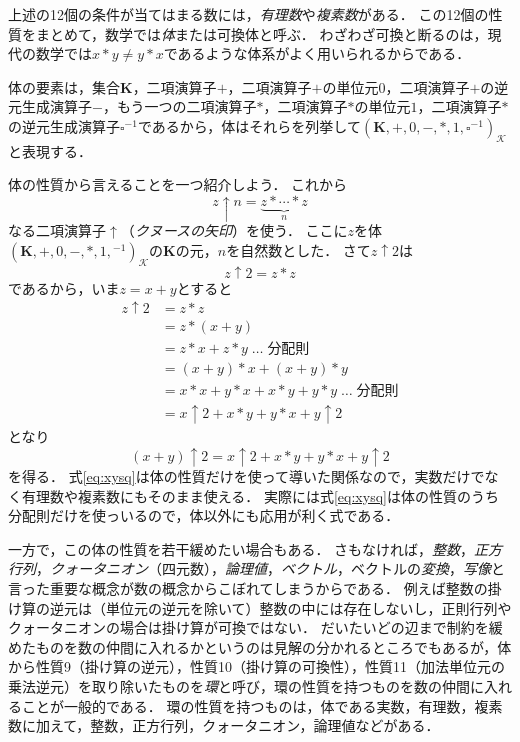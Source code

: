 \documentclass[twocolumn]{jsbook}
\newcommand{\keyword}[1]{\emph{#1}}
\newcommand{\mathSomething}{\square}
\newcommand{\mathSet}[1]{\mathbf{#1}}
\newcommand{\mathField}[7]{(#1,#2,#3,#4,#5,#6,#7)_\mathcal{K}}
\begin{document}
上述の12個の条件が当てはまる数には，\keyword{有理数}や\keyword{複素数}がある．
この12個の性質をまとめて，数学では\keyword{体}または可換体と呼ぶ．
わざわざ可換と断るのは，現代の数学では$x*y\neq y*x$であるような体系がよく用いられるからである．

体の要素は，集合$\mathSet{K}$，二項演算子$+$，二項演算子$+$の単位元$0$，二項演算子$+$の逆元生成演算子$-$，もう一つの二項演算子$*$，二項演算子$*$の単位元$1$，二項演算子$*$の逆元生成演算子$\mathSomething^{-1}$であるから，体はそれらを列挙して$\mathField{\mathSet{K}}{+}{0}{-}{*}{1}{\mathSomething^{-1}}$と表現する．

体の性質から言えることを一つ紹介しよう．
これから$$z\uparrow n=\underbrace{z*\dotsb*z}_n$$なる二項演算子$\uparrow$（\keyword{クヌースの矢印}）を使う．
ここに$z$を体$\mathField{\mathSet{K}}{+}{0}{-}{*}{1}{{}^{-1}}$の$\mathSet{K}$の元，$n$を自然数とした．
さて$z\uparrow2$は$$z\uparrow2=z*z$$であるから，いま$z=x+y$とすると
\begin{align*}
z\uparrow2&=z*z\\
&=z*(x+y)\\
&=z*x+z*y\;\dots\;\text{分配則}\\
&=(x+y)*x+(x+y)*y\\
&=x*x+y*x+x*y+y*y\;\dots\;\text{分配則}\\
&=x\uparrow2+x*y+y*x+y\uparrow2
\end{align*}
となり
\begin{equation}
\label{eq:xysq}
(x+y)\uparrow2=x\uparrow2+x*y+y*x+y\uparrow2
\end{equation}
を得る．
式\eqref{eq:xysq}は体の性質だけを使って導いた関係なので，実数だけでなく有理数や複素数にもそのまま使える．
実際には式\eqref{eq:xysq}は体の性質のうち分配則だけを使っいるので，体以外にも応用が利く式である．

一方で，この体の性質を若干緩めたい場合もある．
さもなければ，\keyword{整数}，\keyword{正方行列}，\keyword{クォータニオン}（四元数），\keyword{論理値}，\keyword{ベクトル}，ベクトルの\keyword{変換}，\keyword{写像}と言った重要な概念が数の概念からこぼれてしまうからである．
例えば整数の掛け算の逆元は（単位元の逆元を除いて）整数の中には存在しないし，正則行列やクォータニオンの場合は掛け算が可換ではない．
だいたいどの辺まで制約を緩めたものを数の仲間に入れるかというのは見解の分かれるところでもあるが，体から性質9（掛け算の逆元），性質10（掛け算の可換性），性質11（加法単位元の乗法逆元）を取り除いたものを\keyword{環}と呼び，環の性質を持つものを数の仲間に入れることが一般的である．
環の性質を持つものは，体である実数，有理数，複素数に加えて，整数，正方行列，クォータニオン，論理値などがある．
\end{document}
